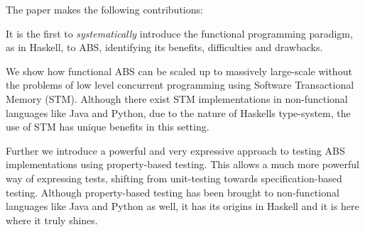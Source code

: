 The paper makes the following contributions:

\begin{itemize*}
	\item It is the first to \textit{systematically} introduce the functional programming paradigm, as in Haskell, to ABS, identifying its benefits, difficulties and drawbacks. 
	\item We show how functional ABS can be scaled up to massively large-scale without the problems of low level concurrent programming using Software Transactional Memory (STM). Although there exist STM implementations in non-functional languages like Java and Python, due to the nature of Haskells type-system, the use of STM has unique benefits in this setting.
	\item Further we introduce a powerful and very expressive approach to testing ABS implementations using property-based testing. This allows a much more powerful way of expressing tests, shifting from unit-testing towards specification-based testing. Although property-based testing has been brought to non-functional languages like Java and Python as well, it has its origins in Haskell and it is here where it truly shines.
\end{itemize*}
